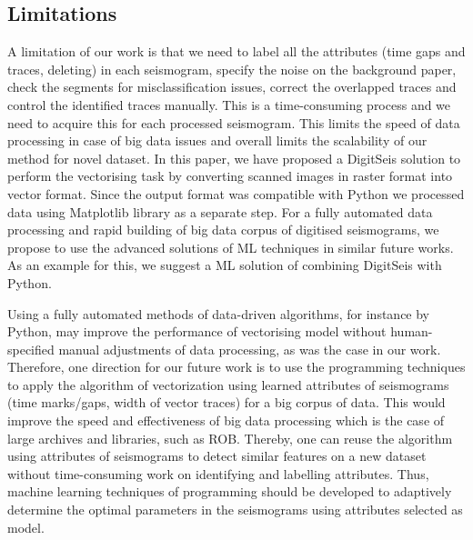 \documentclass[sensors,article,accept,moreauthors,pdftex]{Definitions/mdpi}
\begin{document}
\subsection{Limitations}
{A limitation of our work is that we need to label all the attributes (time gaps and traces, deleting) in each seismogram, specify the noise on the background paper, check the segments for misclassification issues, correct the overlapped traces and control the identified traces manually. This is a time-consuming process and we need to acquire this for each processed seismogram. This limits the speed of data processing in case of big data issues and overall limits the scalability of our method for novel dataset. In this paper, we have proposed a DigitSeis solution to perform the vectorising task by converting scanned images in raster format into vector format. Since the output format was compatible with Python we processed data using Matplotlib library as a separate step. }For {a }fully automated data processing and rapid building of big data corpus of digitised seismograms, {we propose to use }the advanced solutions of  {ML} techniques{ in similar future works. }As {an example }for this, we {suggest} a  {ML} solution of combining DigitSeis with Python. 

{Using a fully automated methods of data-driven algorithms, for instance by Python, may improve the performance of vectorising model without human-specified manual adjustments of data processing, as was the case in our work. Therefore, one direction for our future work is to use the programming techniques to apply the algorithm of vectorization using learned attributes of seismograms (time marks/gaps, width of vector traces) for a big corpus of data. This would improve the speed and effectiveness of big data processing which is the case of large archives and libraries, such as ROB. Thereby, one can reuse the algorithm using attributes of seismograms to detect similar features on a new dataset without time-consuming work on identifying and labelling attributes. Thus, machine learning techniques of programming should be developed to adaptively determine the optimal parameters in the seismograms using attributes selected as model.}
\end{document}
